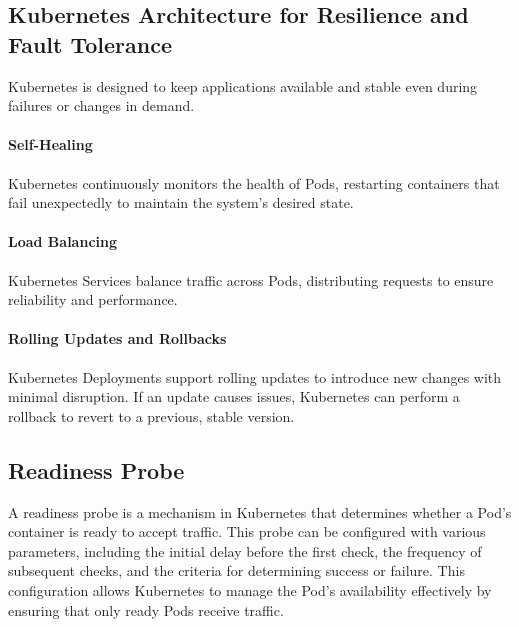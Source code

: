 \documentclass[main.tex]{subfiles}
\begin{document}
\subsection{Kubernetes Architecture for Resilience and Fault Tolerance}
Kubernetes is designed to keep applications available and stable even during failures or changes in demand.

\paragraph{Self-Healing}
Kubernetes continuously monitors the health of Pods, restarting containers that fail unexpectedly to maintain the system's desired state.

\paragraph{Load Balancing}
Kubernetes Services balance traffic across Pods, distributing requests to ensure reliability and performance.

\paragraph{Rolling Updates and Rollbacks}
Kubernetes Deployments support rolling updates to introduce new changes with minimal disruption. If an update causes issues, Kubernetes can perform a rollback to revert to a previous, stable version.

\subsection{Readiness Probe}
A readiness probe is a mechanism in Kubernetes that determines whether a Pod's container is ready to accept traffic. This probe can be configured with various parameters, including the initial delay before the first check, the frequency of subsequent checks, and the criteria for determining success or failure. This configuration allows Kubernetes to manage the Pod's availability effectively by ensuring that only ready Pods receive traffic.
\end{document}
